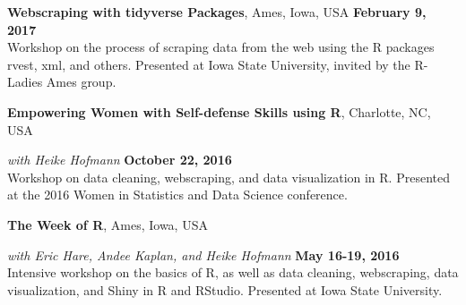 \documentclass[margin,line]{res}
\begin{document}
\begin{resume}
{\bf Webscraping with tidyverse Packages}, Ames, Iowa, USA \hfill {\bf February 9, 2017}\\
Workshop on the process of scraping data from the web using the R packages rvest, xml, and others. Presented at Iowa State University, invited by the R-Ladies Ames group.

{\bf Empowering Women with Self-defense Skills using R}, Charlotte, NC, USA

\vspace{-.4cm}

{\em with Heike Hofmann} \hfill {\bf October 22, 2016}\\
Workshop on data cleaning, webscraping, and data visualization in R. Presented at the 2016 Women in Statistics and Data Science conference.

\vspace{-.2cm}

\clearpage 
{\bf The Week of R}, Ames, Iowa, USA

\vspace{-.4cm}

{\em with Eric Hare, Andee Kaplan, and Heike Hofmann} \hfill {\bf May 16-19, 2016}\\
Intensive workshop on the basics of R, as well as data cleaning, webscraping, data visualization, and Shiny in R and RStudio. Presented at Iowa State University.
 


\end{resume}
\end{document}
